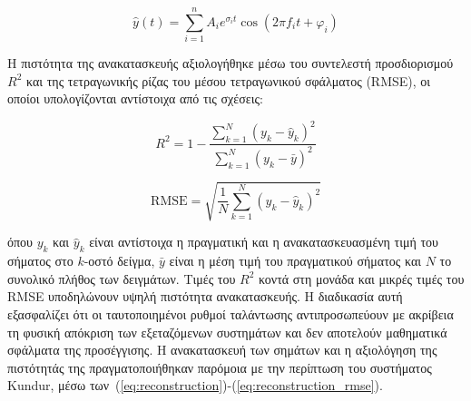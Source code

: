 \begin{equation}
\hat{y}(t)=\sum_{i=1}^{n}A_{i}e^{\sigma_{i}t}\cos(2\pi f_{i}t+\varphi_{i})
\label{eq:reconstruction}
\end{equation}

Η πιστότητα της ανακατασκευής αξιολογήθηκε μέσω του συντελεστή προσδιορισμού $R^{2}$ και της τετραγωνικής ρίζας του μέσου τετραγωνικού σφάλματος (RMSE), οι οποίοι υπολογίζονται αντίστοιχα από τις σχέσεις:

\begin{equation}
R^2=1-\frac{\displaystyle\sum_{k=1}^{N}\left(y_k-\hat{y}_k\right)^2}
{\displaystyle\sum_{k=1}^{N}\left(y_k-\bar{y}\right)^2}
\label{eq:reconstruction_r2}
\end{equation}

\begin{equation}
\mathrm{RMSE}=\sqrt{\frac{1}{N}\sum_{k=1}^{N}\left(y_k-\hat{y}_k\right)^2}
\label{eq:reconstruction_rmse}
\end{equation}

όπου $y_k$ και $\hat{y}_k$ είναι αντίστοιχα η πραγματική και η ανακατασκευασμένη τιμή του σήματος στο $k$-οστό δείγμα, $\bar{y}$ είναι η μέση τιμή του πραγματικού σήματος και $N$ το συνολικό πλήθος των δειγμάτων. Τιμές του $R^2$ κοντά στη μονάδα και μικρές τιμές του RMSE υποδηλώνουν υψηλή πιστότητα ανακατασκευής. Η διαδικασία αυτή εξασφαλίζει ότι οι ταυτοποιημένοι ρυθμοί ταλάντωσης αντιπροσωπεύουν με ακρίβεια τη φυσική απόκριση των εξεταζόμενων συστημάτων και δεν αποτελούν μαθηματικά σφάλματα της προσέγγισης.
\else
Η ανακατασκευή των σημάτων και η αξιολόγηση της πιστότητάς της πραγματοποιήθηκαν παρόμοια με την περίπτωση του συστήματος Kundur, μέσω των~(\ref{eq:reconstruction})-(\ref{eq:reconstruction_rmse}).
\fi


